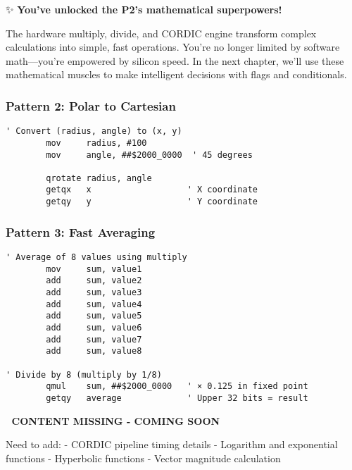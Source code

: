 \documentclass[11pt]{book}
\begin{document}
\begin{chapterend}
✨ \textbf{You've unlocked the P2's mathematical superpowers!}

The hardware multiply, divide, and CORDIC engine transform complex calculations into simple, fast operations. You're no longer limited by software math—you're empowered by silicon speed. In the next chapter, we'll use these mathematical muscles to make intelligent decisions with flags and conditionals.
\end{chapterend}

\hypertarget{pattern-2-polar-to-cartesian}{%
\subsubsection{Pattern 2: Polar to
Cartesian}\label{pattern-2-polar-to-cartesian}}

\begin{lstlisting}
' Convert (radius, angle) to (x, y)
        mov     radius, #100
        mov     angle, ##$2000_0000  ' 45 degrees
        
        qrotate radius, angle
        getqx   x                   ' X coordinate
        getqy   y                   ' Y coordinate
\end{lstlisting}

\hypertarget{pattern-3-fast-averaging}{%
\subsubsection{Pattern 3: Fast
Averaging}\label{pattern-3-fast-averaging}}

\begin{lstlisting}
' Average of 8 values using multiply
        mov     sum, value1
        add     sum, value2
        add     sum, value3
        add     sum, value4
        add     sum, value5
        add     sum, value6
        add     sum, value7
        add     sum, value8
        
' Divide by 8 (multiply by 1/8)
        qmul    sum, ##$2000_0000   ' × 0.125 in fixed point
        getqy   average             ' Upper 32 bits = result
\end{lstlisting}

\begin{missing}
🚧 \textbf{CONTENT MISSING - COMING SOON}

Need to add:
- CORDIC pipeline timing details
- Logarithm and exponential functions
- Hyperbolic functions
- Vector magnitude calculation
\end{missing}
\end{document}

